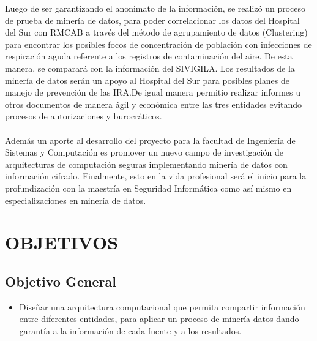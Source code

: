 \documentclass[a4paper,openright,12pt]{book}
\theoremstyle{definition}
\theoremstyle{remark}
\begin{document}
Luego de ser garantizando el anonimato de la información, se realizó un proceso de prueba de minería de datos, para poder correlacionar los datos del Hospital del Sur con RMCAB a través del método de agrupamiento de datos (Clustering) para encontrar los posibles focos de concentración de población con infecciones de respiración aguda referente a los registros de contaminación del aire. De esta manera, se comparará con la información del SIVIGILA. Los resultados de la minería de datos serán un apoyo  al Hospital del Sur para posibles planes de manejo de prevención de las IRA.De igual manera permitio realizar informes u otros documentos de manera ágil y económica entre las tres entidades evitando procesos de autorizaciones y burocráticos.\\\\
Además un aporte al desarrollo del proyecto para la facultad de Ingeniería de Sistemas y Computación es promover un nuevo campo de investigación de arquitecturas de computación seguras implementando minería de datos con información cifrado. Finalmente, esto en la vida profesional será el inicio para la profundización con la maestría en Seguridad Informática como así mismo en especializaciones en minería de datos.

\section{OBJETIVOS}

\subsection{Objetivo General}
\begin{itemize}
\item Diseñar una arquitectura computacional que permita compartir información entre diferentes entidades, para aplicar un proceso de minería datos dando garantía a la información de cada fuente y a los resultados. 
\end{itemize}
\end{document}
